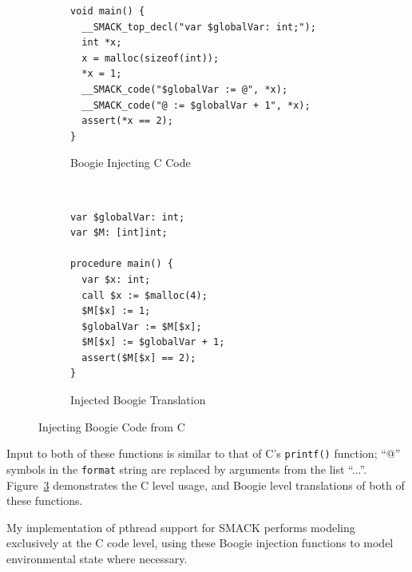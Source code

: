 \begin{figure}[!ht]
\centering
\begin{subfigure}[b]{1\textwidth}
\centering
\begin{lstlisting}
void main() {
  __SMACK_top_decl("var $globalVar: int;");
  int *x;
  x = malloc(sizeof(int));
  *x = 1;
  __SMACK_code("$globalVar := @", *x);
  __SMACK_code("@ := $globalVar + 1", *x);
  assert(*x == 2);
}
\end{lstlisting}
\caption{Boogie Injecting C Code}\label{fig:cinjToBoogie_a}
\end{subfigure}
~
\begin{subfigure}[b]{1\textwidth}
\centering
\begin{lstlisting}[language=boogie]
var $globalVar: int;
var $M: [int]int;

procedure main() {
  var $x: int;
  call $x := $malloc(4);
  $M[$x] := 1;
  $globalVar := $M[$x];
  $M[$x] := $globalVar + 1;
  assert($M[$x] == 2);
}
\end{lstlisting}
\caption{Injected Boogie Translation}\label{fig:cinjToBoogie_b}
\end{subfigure}
\caption{Injecting Boogie Code from C}\label{fig:cinjToBoogie}
\end{figure}

Input to both of these functions is similar to that of C's
\lstinline|printf()| function; ``@'' symbols in the
\lstinline|format| string are replaced by arguments from the list
``...''.  Figure~\ref{fig:cinjToBoogie} demonstrates the C level usage,
and Boogie level translations of both of these functions.

My implementation of pthread support for SMACK performs modeling
exclusively at the C code level, using these Boogie injection
functions to model environmental state where necessary.

